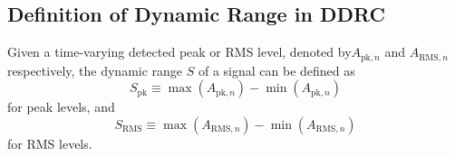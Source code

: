 \documentclass[../main2.tex]{subfiles}
\begin{document}
\subsection{Definition of Dynamic Range in DDRC}\label{def_dynamic_range}
Given a time-varying detected peak or RMS level,  denoted by$A_{\text{pk},n}$ and $A_{\text{RMS},n}$ respectively, the dynamic range $S$ of a signal can be defined as
\begin{equation}\label{eq:s_peak}
S_\text{pk} \equiv \max(A_{\text{pk},n}) - \min(A_{\text{pk},n})
\end{equation}
for peak levels, and
\begin{equation}\label{eq:s_RMS}
S_\text{RMS} \equiv \max(A_{\text{RMS},n}) - \min(A_{\text{RMS},n})
\end{equation}
for RMS levels.
\end{document}
